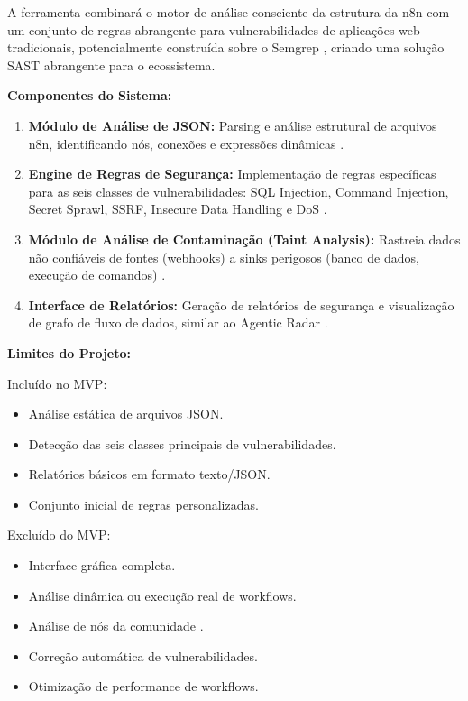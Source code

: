 \documentclass{sftex}
\begin{document}
A ferramenta combinará o motor de análise consciente da estrutura da n8n com um conjunto de regras abrangente para vulnerabilidades de aplicações web tradicionais, potencialmente construída sobre o Semgrep \cite{semgrep_platform}, criando uma solução SAST abrangente para o ecossistema.

\textbf{Componentes do Sistema:}
\begin{enumerate}
  \item \textbf{Módulo de Análise de JSON:} Parsing e análise estrutural de arquivos n8n, identificando nós, conexões e expressões dinâmicas \cite{n8n_ai_coding}.
  \item \textbf{Engine de Regras de Segurança:} Implementação de regras específicas para as seis classes de vulnerabilidades: SQL Injection, Command Injection, Secret Sprawl, SSRF, Insecure Data Handling e DoS \cite{semgrep_custom_rules}.
  \item \textbf{Módulo de Análise de Contaminação (Taint Analysis):} Rastreia dados não confiáveis de fontes (webhooks) a sinks perigosos (banco de dados, execução de comandos) \cite{prototype_pollution}.
  \item \textbf{Interface de Relatórios:} Geração de relatórios de segurança e visualização de grafo de fluxo de dados, similar ao Agentic Radar \cite{splxai_n8n_scanning}.
\end{enumerate}

\textbf{Limites do Projeto:}

Incluído no MVP:
\begin{itemize}
  \item Análise estática de arquivos JSON.
  \item Detecção das seis classes principais de vulnerabilidades.
  \item Relatórios básicos em formato texto/JSON.
  \item Conjunto inicial de regras personalizadas.
\end{itemize}

Excluído do MVP:
\begin{itemize}
  \item Interface gráfica completa.
  \item Análise dinâmica ou execução real de workflows.
  \item Análise de nós da comunidade \cite{n8n_cybersecurity_workflows}.
  \item Correção automática de vulnerabilidades.
  \item Otimização de performance de workflows.
\end{itemize}
\end{document}
